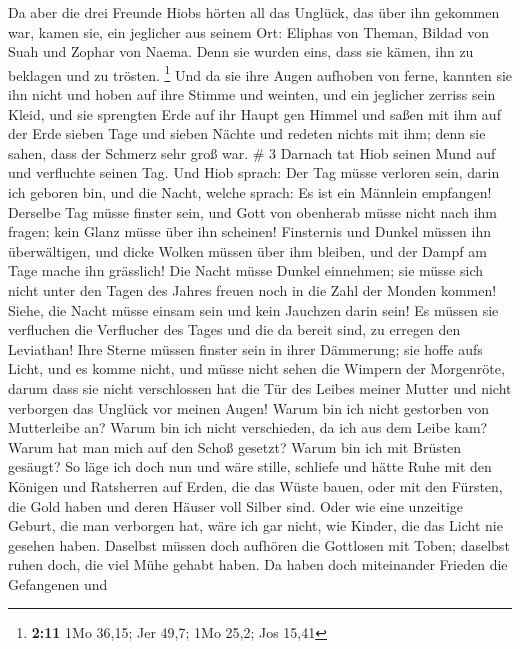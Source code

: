  Da aber die drei Freunde Hiobs hörten all das Unglück,
das über ihn gekommen war, kamen sie, ein jeglicher aus seinem Ort:
Eliphas von Theman, Bildad von Suah und Zophar von Naema. Denn sie
wurden eins, dass sie kämen, ihn zu beklagen und zu trösten. \footnote{\textbf{2:11}
  1Mo 36,15; Jer 49,7; 1Mo 25,2; Jos 15,41}  Und da sie
ihre Augen aufhoben von ferne, kannten sie ihn nicht und hoben auf ihre
Stimme und weinten, und ein jeglicher zerriss sein Kleid, und sie
sprengten Erde auf ihr Haupt gen Himmel  und saßen mit
ihm auf der Erde sieben Tage und sieben Nächte und redeten nichts mit
ihm; denn sie sahen, dass der Schmerz sehr groß war. \# 3 
Darnach tat Hiob seinen Mund auf und verfluchte seinen Tag.
 Und Hiob sprach:  Der Tag müsse verloren
sein, darin ich geboren bin, und die Nacht, welche sprach: Es ist ein
Männlein empfangen!  Derselbe Tag müsse finster sein, und
Gott von obenherab müsse nicht nach ihm fragen; kein Glanz müsse über
ihn scheinen!  Finsternis und Dunkel müssen ihn
überwältigen, und dicke Wolken müssen über ihm bleiben, und der Dampf am
Tage mache ihn grässlich!  Die Nacht müsse Dunkel
einnehmen; sie müsse sich nicht unter den Tagen des Jahres freuen noch
in die Zahl der Monden kommen!  Siehe, die Nacht müsse
einsam sein und kein Jauchzen darin sein!  Es müssen sie
verfluchen die Verflucher des Tages und die da bereit sind, zu erregen
den Leviathan!  Ihre Sterne müssen finster sein in ihrer
Dämmerung; sie hoffe aufs Licht, und es komme nicht, und müsse nicht
sehen die Wimpern der Morgenröte,  darum dass sie nicht
verschlossen hat die Tür des Leibes meiner Mutter und nicht verborgen
das Unglück vor meinen Augen!  Warum bin ich nicht
gestorben von Mutterleibe an? Warum bin ich nicht verschieden, da ich
aus dem Leibe kam?  Warum hat man mich auf den Schoß
gesetzt? Warum bin ich mit Brüsten gesäugt?  So läge ich
doch nun und wäre stille, schliefe und hätte Ruhe  mit
den Königen und Ratsherren auf Erden, die das Wüste bauen,
 oder mit den Fürsten, die Gold haben und deren Häuser
voll Silber sind.  Oder wie eine unzeitige Geburt, die
man verborgen hat, wäre ich gar nicht, wie Kinder, die das Licht nie
gesehen haben.  Daselbst müssen doch aufhören die
Gottlosen mit Toben; daselbst ruhen doch, die viel Mühe gehabt haben.
 Da haben doch miteinander Frieden die Gefangenen und
